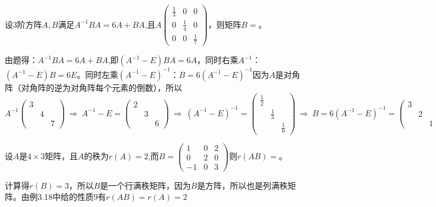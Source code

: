 \documentclass[a4paper]{report}
\begin{document}
\EX

\EX 设3阶方阵$A,B$满足$A^{-1}BA=6A+BA$,且$A
\begin{pmatrix}
\frac{1}{3}&0&0\\
0&\frac{1}{4}&0\\
0&0&\frac{1}{7}
\end{pmatrix}
$，则矩阵$B=$\underline{\hphantom{~~~~~~~~~~~}}。

\begin{jie}
由题得：$A^{-1}BA=6A+BA$,即$(A^{-1}-E)BA=6A$，同时右乘$A^{-1}$：$(A^{-1}-E)B=6E$。同时左乘$(A^{-1}-E)^{-1}$：$B=6(A^{-1}-E)^{-1}$因为$A$是对角阵（对角阵的逆为对角阵每个元素的倒数），所以
\begin{equation*}
A^{-1}
\begin{pmatrix}
3&&\\
&4&\\
&&7
\end{pmatrix}~\Rightarrow~A^{-1}-E=
\begin{pmatrix}
2&&\\
&3&\\
&&6
\end{pmatrix}~\Rightarrow~(A^{-1}-E)^{-1}=
\begin{pmatrix}
\frac{1}{2}&&\\
&\frac{1}{3}&\\
&&\frac{1}{6}
\end{pmatrix}~\Rightarrow~B=6(A^{-1}-E)^{-1}=
\begin{pmatrix}
3&&\\
&2&\\
&&1
\end{pmatrix}
\end{equation*}
\end{jie}

\EX 设$A$是$4\times 3$矩阵，且$A$的秩为$r(A)=2$,而$B=
\begin{pmatrix}
1&0&2\\
0&2&0\\
-1&0&3
\end{pmatrix}
$则$r(AB)=$\underline{\hphantom{~~~~~~~}}。

\begin{jie}
计算得$r(B)=3$，所以$B$是一个行满秩矩阵，因为$B$是方阵，所以也是列满秩矩阵。由例3.18中给的性质9有$r(AB)=r(A)=2$
\end{jie}
\end{document}
